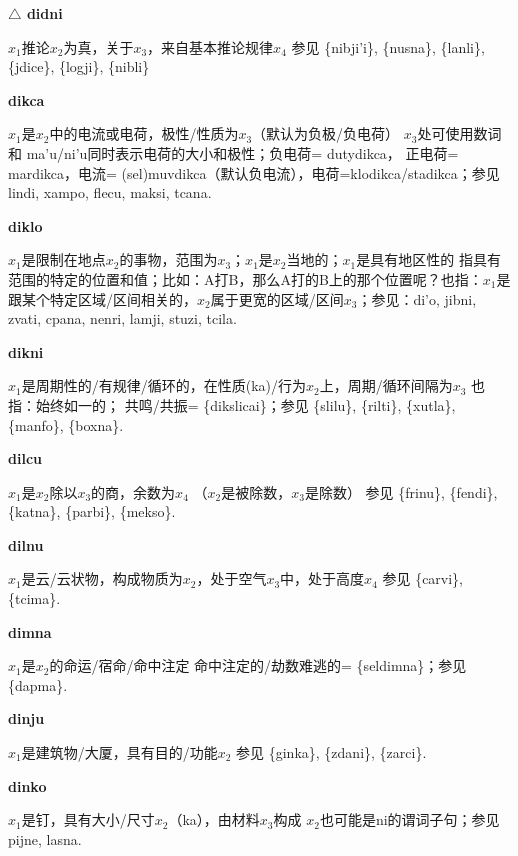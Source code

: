 \documentclass[notitlepage,twocolumn,a4paper,10pt]{book}
\begin{document}
{\sffamily\bfseries $\triangle$ didni} $x_1$推论$x_2$为真，关于$x_3$，来自基本推论规律$x_4$ \textemdash{} 参见 \{nibji'i\}, \{nusna\}, \{lanli\}, \{jdice\}, \{logji\}, \{nibli\}

{\sffamily\bfseries dikca}\enspace {\ttfamily\bfseries[dic]}  $x_1$是$x_2$中的电流或电荷，极性\slash{}性质为$x_3$（默认为负极\slash{}负电荷） \textemdash{} $x_3$处可使用数词和 {ma'u}\slash{}{ni'u}同时表示电荷的大小和极性；负电荷= {dutydikca}， 正电荷= {mardikca}，电流= (sel)muvdikca（默认负电流），电荷={klodikca}\slash{}{stadikca}；参见 {lindi}, {xampo}, {flecu}, {maksi}, {tcana}.

{\sffamily\bfseries diklo}\enspace {\ttfamily\bfseries[    klo]}  $x_1$是限制在地点$x_2$的事物，范围为$x_3$；$x_1$是$x_2$当地的；$x_1$是具有地区性的 \textemdash{} 指具有范围的特定的位置和值；比如：A打B，那么A打的B上的那个位置呢？也指：$x_1$是跟某个特定区域\slash{}区间相关的，$x_2$属于更宽的区域\slash{}区间$x_3$；参见：{di'o}, {jibni}, {zvati}, {cpana}, {nenri}, {lamji}, {stuzi}, {tcila}.

{\sffamily\bfseries dikni}\enspace {\ttfamily\bfseries[dik]}  $x_1$是周期性的\slash{}有规律\slash{}循环的，在性质(ka)\slash{}行为$x_2$上，周期\slash{}循环间隔为$x_3$ \textemdash{} 也指：始终如一的； 共鸣\slash{}共振= \{dikslicai\}；参见 \{slilu\}, \{rilti\}, \{xutla\}, \{manfo\}, \{boxna\}.

{\sffamily\bfseries dilcu} $x_1$是$x_2$除以$x_3$的商，余数为$x_4$ （$x_2$是被除数，$x_3$是除数） \textemdash{} 参见 \{frinu\}, \{fendi\}, \{katna\}, \{parbi\}, \{mekso\}.

{\sffamily\bfseries dilnu}\enspace {\ttfamily\bfseries[dil]}  $x_1$是云\slash{}云状物，构成物质为$x_2$，处于空气$x_3$中，处于高度$x_4$ \textemdash{} 参见 \{carvi\}, \{tcima\}.

{\sffamily\bfseries dimna}\enspace {\ttfamily\bfseries[dim]}  $x_1$是$x_2$的命运\slash{}宿命\slash{}命中注定 \textemdash{} 命中注定的\slash{}劫数难逃的= \{seldimna\}；参见 \{dapma\}.

{\sffamily\bfseries dinju}\enspace {\ttfamily\bfseries[dij     di'u]}  $x_1$是建筑物\slash{}大厦，具有目的\slash{}功能$x_2$ \textemdash{} 参见 \{ginka\}, \{zdani\}, \{zarci\}.

{\sffamily\bfseries dinko}\enspace {\ttfamily\bfseries[        di'o]}  $x_1$是钉，具有大小\slash{}尺寸$x_2$（ka），由材料$x_3$构成 \textemdash{} $x_2$也可能是ni的谓词子句；参见 {pijne}, {lasna}.
\end{document}

